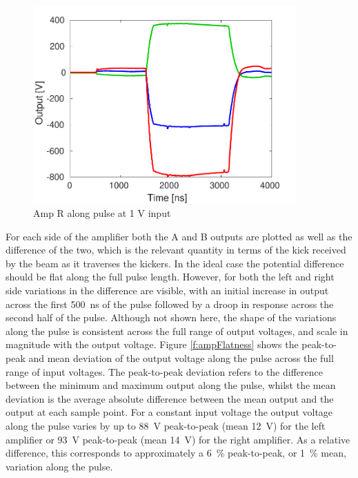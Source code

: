 \begin{figure}
  \centering
  \includegraphics[width=0.9\textwidth]{Figures/commissioning/AmpR_Traces}
  \caption{Amp R along pulse at 1 V input}
  \label{f:ampRTraces}
\end{figure}

For each side of the amplifier both the A and B outputs are plotted as well as the difference of the two, which is the relevant quantity in terms of the kick received by the beam as it traverses the kickers. In the ideal case the potential difference should be flat along the full pulse length. However, for both the left and right side variations in the difference are visible, with an initial increase in output across the first 500~ns of the pulse followed by a droop in response across the second half of the pulse. Although not shown here, the shape of the variations along the pulse is consistent across the full range of output voltages, and scale in magnitude with the output voltage. Figure \ref{f:ampFlatness} shows the peak-to-peak and mean deviation of the output voltage along the pulse across the full range of input voltages. The peak-to-peak deviation refers to the difference between the minimum and maximum output along the pulse, whilst the mean deviation is the average absolute difference between the mean output and the output at each sample point. For a constant input voltage the output voltage along the pulse varies by up to 88~V peak-to-peak (mean 12~V) for the left amplifier or 93~V peak-to-peak (mean 14~V) for the right amplifier. As a relative difference, this corresponds to approximately a 6~\% peak-to-peak, or 1~\% mean, variation along the pulse.

